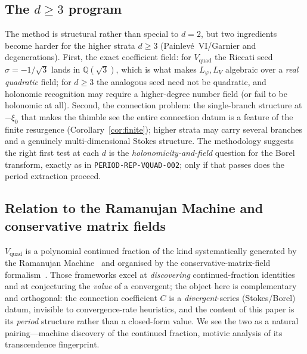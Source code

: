 \documentclass[11pt,reqno]{amsart}
\renewcommand{\_}{\vquadorigunderscore\allowbreak}
\theoremstyle{plain}
\theoremstyle{definition}
\newcommand{\Vquad}{V_{\mathrm{quad}}}
\newcommand{\Lphi}{L_{\varphi}}
\newcommand{\LV}{L_{V}}
\newcommand{\Qsqrt}{\mathbb{Q}(\sqrt3)}
\newcommand{\xizero}{\xi_0}
\providecommand{\C}{}\renewcommand{\C}{C}
\begin{document}
\subsection{The $d\ge3$ program}
The method is structural rather than special to $d=2$, but two ingredients become harder for the
higher strata $d\ge3$ (Painlev\'e~VI/Garnier and degenerations). First, the exact coefficient
field: for $\Vquad$ the Riccati seed $\sigma=-1/\sqrt3$ lands in $\Qsqrt$, which is what makes
$\Lphi,\LV$ algebraic over a \emph{real quadratic} field; for $d\ge3$ the analogous seed need not
be quadratic, and holonomic recognition may require a higher-degree number field (or fail to be
holonomic at all). Second, the connection problem: the single-branch structure at $-\xizero$ that
makes the thimble see the entire connection datum is a feature of the finite resurgence
(Corollary~\ref{cor:finite}); higher strata may carry several branches and a genuinely
multi-dimensional Stokes structure. The methodology suggests the right first test at each $d$ is
the \emph{holonomicity-and-field} question for the Borel transform, exactly as in
\texttt{PERIOD-REP-VQUAD-002}; only if that passes does the period extraction proceed.

\subsection{Relation to the Ramanujan Machine and conservative matrix fields}
$\Vquad$ is a polynomial continued fraction of the kind systematically generated by the Ramanujan
Machine~\cite{RamanujanMachine} and organised by the conservative-matrix-field formalism~\cite{CMF}.
Those frameworks excel at \emph{discovering} continued-fraction identities and at conjecturing the
\emph{value} of a convergent; the object here is complementary and orthogonal: the connection
coefficient $\C$ is a \emph{divergent}-series (Stokes/Borel) datum, invisible to convergence-rate
heuristics, and the content of this paper is its \emph{period} structure rather than a closed-form
value. We see the two as a natural pairing---machine discovery of the continued fraction, motivic
analysis of its transcendence fingerprint.
\end{document}
